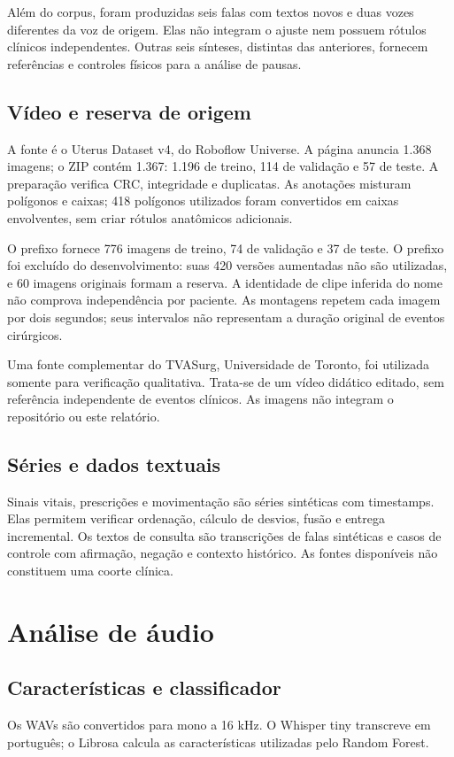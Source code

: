 \documentclass[12pt,a4paper]{article}
\newcommand{\code}[1]{\texttt{\small\detokenize{#1}}}
\begin{document}
Além do corpus, foram produzidas seis falas com textos novos e duas vozes diferentes da voz de origem. Elas não integram o ajuste nem possuem rótulos clínicos independentes. Outras seis sínteses, distintas das anteriores, fornecem referências e controles físicos para a análise de pausas.

\subsection{Vídeo e reserva de origem}
A fonte é o Uterus Dataset v4, do Roboflow Universe. A página anuncia 1.368 imagens; o ZIP contém 1.367: 1.196 de treino, 114 de validação e 57 de teste. A preparação verifica CRC, integridade e duplicatas. As anotações misturam polígonos e caixas; 418 polígonos utilizados foram convertidos em caixas envolventes, sem criar rótulos anatômicos adicionais.

O prefixo \code{UterusClip_mov} fornece 776 imagens de treino, 74 de validação e 37 de teste. O prefixo \code{2024-09-26-20-27-33_mp4} foi excluído do desenvolvimento: suas 420 versões aumentadas não são utilizadas, e 60 imagens originais formam a reserva. A identidade de clipe inferida do nome não comprova independência por paciente. As montagens repetem cada imagem por dois segundos; seus intervalos não representam a duração original de eventos cirúrgicos.

Uma fonte complementar do TVASurg, Universidade de Toronto, foi utilizada somente para verificação qualitativa. Trata-se de um vídeo didático editado, sem referência independente de eventos clínicos. As imagens não integram o repositório ou este relatório.

\subsection{Séries e dados textuais}
Sinais vitais, prescrições e movimentação são séries sintéticas com timestamps. Elas permitem verificar ordenação, cálculo de desvios, fusão e entrega incremental. Os textos de consulta são transcrições de falas sintéticas e casos de controle com afirmação, negação e contexto histórico. As fontes disponíveis não constituem uma coorte clínica.

\section{Análise de áudio}
\subsection{Características e classificador}
Os WAVs são convertidos para mono a 16 kHz. O Whisper tiny transcreve em português; o Librosa calcula as características utilizadas pelo Random Forest.
\end{document}
